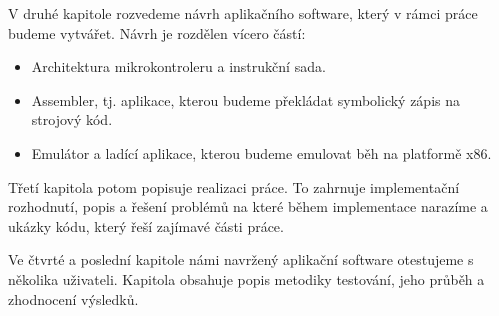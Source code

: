 \begin{introduction}
V druhé kapitole rozvedeme návrh aplikačního software, který v rámci práce budeme vytvářet. Návrh je rozdělen vícero částí:

\begin{itemize}
	\item Architektura mikrokontroleru a instrukční sada.
	\item Assembler, tj. aplikace, kterou budeme překládat symbolický zápis na strojový kód.
	\item Emulátor a ladící aplikace, kterou budeme emulovat běh na platformě x86.
\end{itemize}

Třetí kapitola potom popisuje realizaci práce. To zahrnuje implementační rozhodnutí, popis a řešení problémů na které během implementace narazíme a ukázky kódu, který řeší zajímavé části práce.

Ve čtvrté a poslední kapitole námi navržený aplikační software otestujeme s několika uživateli. Kapitola obsahuje popis metodiky testování, jeho průběh a zhodnocení výsledků.

\end{introduction}
